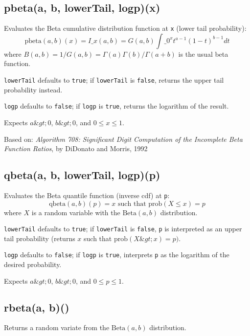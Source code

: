 \documentclass{article}
\begin{document}
    \subsection*{pbeta(a, b, lowerTail, logp)(x)}
    Evaluates the Beta cumulative distribution
function at \texttt{x} (lower tail probability):
$$\textrm{pbeta}(a, b)(x) = I\_x(a, b)=G(a,b)\int\_0^xt^{a-1}(1-t)^{b-1}dt$$
where $B(a,b)=1/G(a,b) = \Gamma(a)\Gamma(b)/\Gamma(a+b)$ is the
usual beta function.


\texttt{lowerTail} defaults to \texttt{true}; if \texttt{lowerTail} is \texttt{false}, returns
the upper tail probability instead.


\texttt{logp} defaults to \texttt{false}; if \texttt{logp} is \texttt{true}, returns the logarithm
of the result.


Expects $a\&gt;0$, $b\&gt;0$, and $0 \leq x \leq 1$.


Based on: \emph{Algorithm 708: Significant Digit Computation of the Incomplete Beta Function
Ratios}, by DiDonato and Morris, 1992


    \subsection*{qbeta(a, b, lowerTail, logp)(p)}
    Evaluates the Beta quantile function (inverse cdf) at \texttt{p}:
$$\textrm{qbeta}(a, b)(p) = x \textrm{ such that } \textrm{prob}(X \leq x) = p$$
where $X$ is a random variable with the $\textrm{Beta}(a,b)$ distribution.


\texttt{lowerTail} defaults to \texttt{true}; if \texttt{lowerTail} is \texttt{false}, \texttt{p} is
interpreted as an upper tail probability (returns
$x$ such that $\textrm{prob}(X \&gt; x) = p)$.


\texttt{logp} defaults to \texttt{false}; if \texttt{logp} is \texttt{true}, interprets \texttt{p} as
the logarithm of the desired probability.


Expects $a\&gt;0$, $b\&gt;0$, and $0 \leq p \leq 1$.


    \subsection*{rbeta(a, b)()}
    Returns a random variate from the $\textrm{Beta}(a, b)$ distribution.
\end{document}
